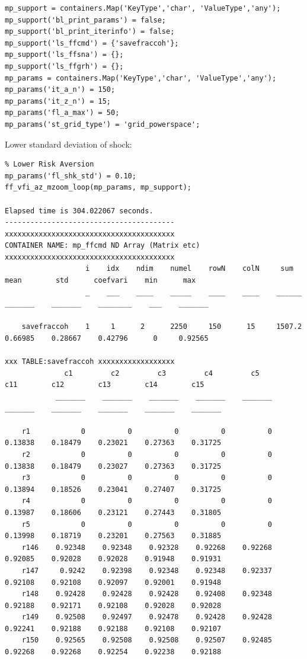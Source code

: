 \documentclass[
]{book}
\begin{document}
\begin{verbatim}
mp_support = containers.Map('KeyType','char', 'ValueType','any');
mp_support('bl_print_params') = false;
mp_support('bl_print_iterinfo') = false;
mp_support('ls_ffcmd') = {'savefraccoh'};
mp_support('ls_ffsna') = {};
mp_support('ls_ffgrh') = {};
mp_params = containers.Map('KeyType','char', 'ValueType','any');
mp_params('it_a_n') = 150;
mp_params('it_z_n') = 15;
mp_params('fl_a_max') = 50;
mp_params('st_grid_type') = 'grid_powerspace';
\end{verbatim}

Lower standard deviation of shock:

\begin{verbatim}
% Lower Risk Aversion
mp_params('fl_shk_std') = 0.10;
ff_vfi_az_mzoom_loop(mp_params, mp_support);

Elapsed time is 304.022067 seconds.
----------------------------------------
xxxxxxxxxxxxxxxxxxxxxxxxxxxxxxxxxxxxxxxx
CONTAINER NAME: mp_ffcmd ND Array (Matrix etc)
xxxxxxxxxxxxxxxxxxxxxxxxxxxxxxxxxxxxxxxx
                   i    idx    ndim    numel    rowN    colN     sum       mean        std      coefvari    min      max  
                   _    ___    ____    _____    ____    ____    ______    _______    _______    ________    ___    _______

    savefraccoh    1     1      2      2250     150      15     1507.2    0.66985    0.28667    0.42796      0     0.92565

xxx TABLE:savefraccoh xxxxxxxxxxxxxxxxxx
              c1         c2         c3         c4         c5         c11        c12        c13        c14        c15  
            _______    _______    _______    _______    _______    _______    _______    _______    _______    _______

    r1            0          0          0          0          0    0.13838    0.18479    0.23021    0.27363    0.31725
    r2            0          0          0          0          0    0.13838    0.18479    0.23027    0.27363    0.31725
    r3            0          0          0          0          0    0.13894    0.18526    0.23041    0.27407    0.31725
    r4            0          0          0          0          0    0.13987    0.18606    0.23121    0.27443    0.31805
    r5            0          0          0          0          0    0.13998    0.18719    0.23201    0.27563    0.31885
    r146    0.92348    0.92348    0.92328    0.92268    0.92268    0.92085    0.92028    0.92028    0.91948    0.91931
    r147     0.9242    0.92398    0.92348    0.92348    0.92337    0.92108    0.92108    0.92097    0.92001    0.91948
    r148    0.92428    0.92428    0.92428    0.92408    0.92348    0.92188    0.92171    0.92108    0.92028    0.92028
    r149    0.92508    0.92497    0.92478    0.92428    0.92428    0.92241    0.92188    0.92188    0.92108    0.92107
    r150    0.92565    0.92508    0.92508    0.92507    0.92485    0.92268    0.92268    0.92254    0.92238    0.92188
\end{verbatim}
\end{document}
